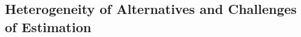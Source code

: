 



\subsection{Heterogeneity of Alternatives and Challenges of Estimation}
\label{sec:estimation}

